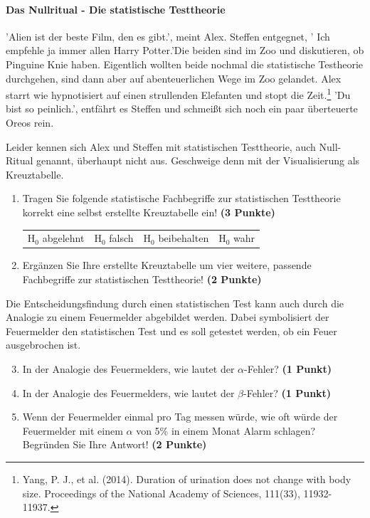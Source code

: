 \documentclass[a4paper, 9pt]{scrartcl}\usepackage[]{graphicx}\usepackage[]{xcolor}
\begin{document}
\ifcollection
\paragraph{Das Nullritual - Die statistische Testtheorie}
\fi

'Alien ist der beste Film, den es gibt.', meint Alex. Steffen entgegnet, ' Ich empfehle ja immer allen Harry Potter.'Die beiden sind im Zoo und diskutieren, ob Pinguine Knie haben. Eigentlich wollten beide nochmal die statistische Testheorie durchgehen, sind dann aber auf abenteuerlichen Wege im Zoo gelandet. Alex starrt wie hypnotisiert auf einen strullenden Elefanten und stopt die Zeit.\footnote{Yang, P. J., et al. (2014). Duration of urination does not change with body size. Proceedings of the National Academy of Sciences, 111(33), 11932-11937.} 'Du bist so peinlich.', entfährt es Steffen und schmeißt sich noch ein paar überteuerte Oreos rein.

\vspace{1ex}

Leider kennen sich Alex und Steffen mit statistischen Testtheorie, auch Null-Ritual genannt, überhaupt nicht aus. Geschweige denn mit der Visualisierung als Kreuztabelle.  

\begin{enumerate}
\item Tragen Sie folgende statistische Fachbegriffe zur statistischen Testtheorie korrekt eine selbst erstellte Kreuztabelle ein! \textbf{(3 Punkte)}
  \begin{center}
  \begin{tabular}{cccc}
  H$_0$ abgelehnt & H$_0$ falsch & H$_0$ beibehalten & H$_0$ wahr \\
  \end{tabular}
  \end{center}
\item Ergänzen Sie Ihre erstellte Kreuztabelle um vier weitere, passende Fachbegriffe zur statistischen Testtheorie! \textbf{(2 Punkte)}
\end{enumerate}

Die Entscheidungsfindung durch einen statistischen Test kann auch durch die Analogie zu einem Feuermelder abgebildet werden. Dabei symbolisiert der Feuermelder den statistischen Test und es soll getestet werden, ob ein Feuer ausgebrochen ist.

\begin{enumerate}
  \setcounter{enumi}{2}    
\item In der Analogie des Feuermelders, wie lautet der $\alpha$-Fehler? \textbf{(1 Punkt)}
\item In der Analogie des Feuermelders, wie lautet der $\beta$-Fehler? \textbf{(1 Punkt)}
\item Wenn der Feuermelder einmal pro Tag messen würde, wie oft würde der Feuermelder mit einem $\alpha$ von 5\% in einem Monat Alarm schlagen? Begründen Sie Ihre Antwort! \textbf{(2 Punkte)}
\end{enumerate}
\end{document}

